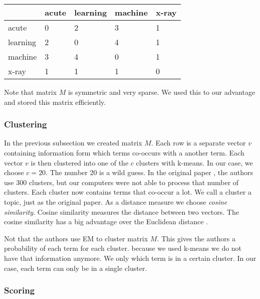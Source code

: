 \begin{table}
	\begin{center}

\begin{tabular}{|l|l|l|l|l|}
\hline
	 	& acute  & learning & machine &  x-ray \\ \hline
acute 	&	0 	& 	2 &	 3 &  1	 \\ \hline
learning&	2	&	0 &	 4 &  1	 \\ \hline
machine &	3	&	4 &	 0 &  1	 \\ \hline
x-ray	&	1	&	1 &	 1 &  0	 \\ \hline
\end{tabular} 

	\end{center}
\end{table}

Note that matrix $M$ is symmetric and very sparse. We used this to our advantage and stored this matrix efficiently.


\subsubsection*{Clustering}

In the previous subsection we created matrix $M$. Each row is a separate vector $v$ containing information form which terms co-occurs with a another term. Each vector $v$ is then clustered into one of the $c$ clusters with k-means. In our case, we choose  $c = 20$. The number 20 is a wild guess. In the original paper \cite{steyvers2004probabilistic}, the authors use 300 clusters, but our computers were not able to process that number of clusters. Each cluster now contains terms that co-occur a lot. We call a cluster a topic, just as the original paper. As a distance measure we choose \emph{cosine similarity}. Cosine similarity measures the distance between two vectors. The cosine similarity has a big advantage over the Euclidean distance \cite{chowdhury2010introduction}.  

Not that the authors use EM to cluster matrix $M$. This gives the authors a probability of each term for each cluster. because we used k-means we do not have that information anymore. We only which term is in a certain cluster. In our case, each term can only be in a single cluster.

\subsubsection*{Scoring}

